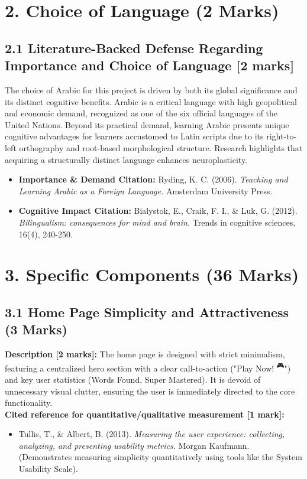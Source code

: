 \documentclass[12pt,a4paper]{article}
\begin{document}
\section*{2. Choice of Language (2 Marks)}
\subsection*{2.1 Literature-Backed Defense Regarding Importance and Choice of Language [2 marks]}
The choice of Arabic for this project is driven by both its global significance and its distinct cognitive benefits. Arabic is a critical language with high geopolitical and economic demand, recognized as one of the six official languages of the United Nations. Beyond its practical demand, learning Arabic presents unique cognitive advantages for learners accustomed to Latin scripts due to its right-to-left orthography and root-based morphological structure. Research highlights that acquiring a structurally distinct language enhances neuroplasticity.
\begin{itemize}[label={--}]
    \item \textbf{Importance \& Demand Citation:} Ryding, K. C. (2006). \textit{Teaching and Learning Arabic as a Foreign Language.} Amsterdam University Press.
    \item \textbf{Cognitive Impact Citation:} Bialystok, E., Craik, F. I., \& Luk, G. (2012). \textit{Bilingualism: consequences for mind and brain.} Trends in cognitive sciences, 16(4), 240-250.
\end{itemize}

\section*{3. Specific Components (36 Marks)}

\subsection*{3.1 Home Page Simplicity and Attractiveness (3 Marks)}
\textbf{Description [2 marks]:} The home page is designed with strict minimalism, featuring a centralized hero section with a clear call-to-action ("Play Now! \textsuperscript{🎮}") and key user statistics (Words Found, Super Mastered). It is devoid of unnecessary visual clutter, ensuring the user is immediately directed to the core functionality. \\
\textbf{Cited reference for quantitative/qualitative measurement [1 mark]:}
\begin{itemize}[label={--}]
    \item Tullis, T., \& Albert, B. (2013). \textit{Measuring the user experience: collecting, analyzing, and presenting usability metrics.} Morgan Kaufmann. (Demonstrates measuring simplicity quantitatively using tools like the System Usability Scale).
\end{itemize}
\end{document}
